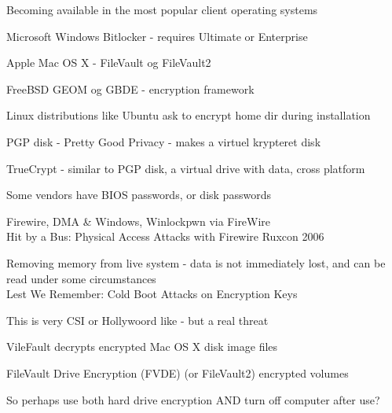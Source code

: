 \documentclass[20pt,landscape,a4paper,footrule]{foils}
\begin{document}


\begin{list1}
\item Becoming available in the most popular client operating systems
\begin{list2}
\item Microsoft Windows Bitlocker - requires Ultimate or Enterprise
\item Apple Mac OS X - FileVault og FileVault2
\item FreeBSD GEOM og GBDE - encryption framework
\item Linux distributions like Ubuntu ask to encrypt home dir during installation
\item PGP disk - Pretty Good Privacy - makes a virtuel krypteret disk
\item TrueCrypt - similar to PGP disk, a virtual drive with data, cross platform
\item Some vendors have BIOS passwords, or disk passwords
\end{list2}
\end{list1}




\begin{list1}
\item Firewire, DMA \& Windows, Winlockpwn via FireWire\\
Hit by a Bus: Physical Access Attacks with Firewire Ruxcon 2006
\vskip 5mm
\item Removing memory from live system - data is not immediately lost, and can be read under some circumstances\\
Lest We Remember: Cold Boot Attacks on Encryption Keys\\
\item This is very CSI or Hollywoord like - but a real threat 
\item VileFault decrypts encrypted Mac OS X disk image files\\ 

\item  FileVault Drive Encryption (FVDE) (or FileVault2) encrypted volumes\\
\end{list1}

\centerline{So perhaps use both hard drive encryption AND turn off computer after use?}
\end{document}
